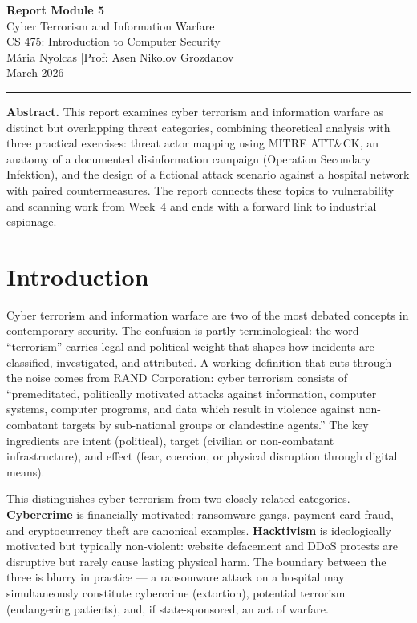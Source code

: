 \documentclass[11pt,a4paper]{article}
\begin{document}
\begin{center}
  {\Large\bfseries Report Module 5}\\[4pt]
  {\large Cyber Terrorism and Information Warfare}\\[6pt]
  {\normalsize CS 475: Introduction to Computer Security}\\[2pt]
  {\normalsize Mária Nyolcas \quad|\quad Prof: Asen Nikolov Grozdanov}\\[2pt]
  {\normalsize March 2026}
\end{center}

\vspace{4pt}
\noindent\rule{\linewidth}{0.6pt}
\vspace{2pt}

\noindent\textbf{Abstract.}
This report examines cyber terrorism and information warfare as distinct but
overlapping threat categories, combining theoretical analysis with three practical
exercises: threat actor mapping using MITRE ATT\&CK, an anatomy of a documented
disinformation campaign (Operation Secondary Infektion), and the design of a
fictional attack scenario against a hospital network with paired countermeasures.
The report connects these topics to vulnerability and scanning work from Week~4
and ends with a forward link to industrial espionage.


\section{Introduction}

Cyber terrorism and information warfare are two of the most debated concepts in
contemporary security. The confusion is partly terminological: the word
``terrorism'' carries legal and political weight that shapes how incidents are
classified, investigated, and attributed. A working definition that cuts through
the noise comes from RAND Corporation: cyber terrorism consists of
``premeditated, politically motivated attacks against information, computer
systems, computer programs, and data which result in violence against
non-combatant targets by sub-national groups or clandestine agents.'' The key
ingredients are intent (political), target (civilian or non-combatant
infrastructure), and effect (fear, coercion, or physical disruption through
digital means).

This distinguishes cyber terrorism from two closely related categories.
\textbf{Cybercrime} is financially motivated: ransomware gangs, payment card
fraud, and cryptocurrency theft are canonical examples. \textbf{Hacktivism} is
ideologically motivated but typically non-violent: website defacement and
DDoS protests are disruptive but rarely cause lasting physical harm. The
boundary between the three is blurry in practice --- a ransomware attack on a
hospital may simultaneously constitute cybercrime (extortion), potential
terrorism (endangering patients), and, if state-sponsored, an act of warfare.
\end{document}
